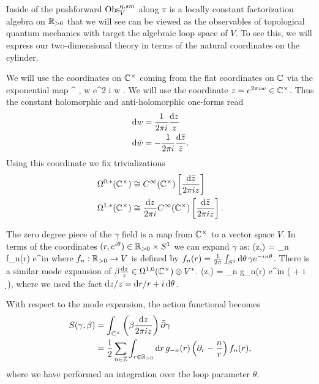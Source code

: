 \documentclass[10pt]{amsart}
\begin{document}
Inside of the pushforward ${\rm Obs}^{{\rm q}, sm}_{V}$ along $\pi$ is a locally constant factorization algebra on $\mathbb R_{>0}$ that we will see can be viewed as the observables of topological quantum mechanics with target the algebraic loop space of $V$. 
To see this, we will express our two-dimensional theory in terms of the natural coordinates on the cylinder. 

We will use the coordinates on $\mathbb C^\times$ coming from the flat coordinates on $\mathbb C$ via the exponential map
\ben
\CC \to \CC^\times \;\; , \;\; w \mapsto e^{2 \pi i w} .
\een
We will use the coordinate $z = e^{2\pi i w} \in \mathbb C^\times$. 
Thus the constant holomorphic and anti-holomorphic one-forms read
\begin{align*}
{\rm d} w & = \frac{1}{2 \pi i} \frac{{\rm d} z}{z} \\
{\rm d} \Bar{w} & = - \frac{1}{2 \pi i} \frac{{\rm d} \Bar{z}}{\Bar{z}} .
\end{align*}
Using this coordinate we fix trivializations
\begin{align*}
\Omega^{0,*}(\mathbb C^\times) & \cong C^\infty(\mathbb C^\times) \left[\frac{{\rm d} \Bar{z}}{2 \pi i z}\right] \\
\Omega^{1,*}(\mathbb C^\times) & \cong \frac{{\rm d} z}{2 \pi i} C^\infty(\mathbb C^\times) \left[\frac{{\rm d} \Bar{z}}{2 \pi i z}\right] .
\end{align*}

The zero degree piece of the $\gamma$ field is a map from $\mathbb C^\times$ to a vector space $V$.
In terms of the coordinates $(r, e^{i \theta}) \in \mathbb R_{>0} \times S^1$ we can expand $\gamma$ as:
\ben
\gamma (z,\zbar) = \sum_{n \in \ZZ} f_n(r) e^{in\theta}
\een
where $f_n : \mathbb R_{>0} \to V$ is defined by $f_n(r) = \frac{1}{2\pi}\int_{S^1}{\rm d}\theta\, \gamma e^{-in\theta}$. 
There is a similar mode expansion of $\beta \frac{{\rm d} z}{z} \in \Omega^{1,0}(\mathbb C^\times) \otimes V^*$. 
\ben
\beta(z,\zbar)  = \sum_{n \in \ZZ} g_n(r) e^{in\theta}  \left( + i \,\d\theta\right),
\een
where we used the fact ${\rm d} z/z = {\rm d} r/r + i \, {\rm d}\theta$. 

With respect to the mode expansion, the action functional becomes
\begin{align}
\label{action for loop mechanics in q coordinates}
S(\gamma,\beta) & = \int_{\mathbb C^\times} \left(\beta \frac{{\rm d} z}{2 \pi i z}\right) \Bar{\partial} \gamma \\ 
& = \frac{1}{2} \sum_{n \in \mathbb Z} \int_{r \in \mathbb R_{> 0}} {\rm d} r \, g_{-n}(r) \left( \partial_r  - \frac{n}{r}\right)f_n(r),
\end{align}
where we have performed an integration over the loop parameter $\theta$. 
\end{document}

